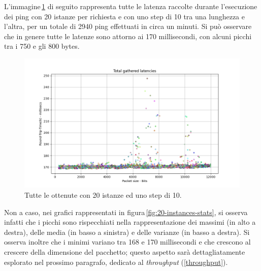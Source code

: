 \noindent L'immagine\,\ref{fig:20-instances-total} di seguito rappresenta tutte le latenza raccolte durante l'esecuzione dei ping con 20 istanze per richiesta e con uno step di 10 tra una lunghezza e l'altra, per un totale di 2940 ping effettuati in circa un minuti. Si può osservare che in genere tutte le latenze sono attorno ai 170 millisecondi, con alcuni picchi tra i 750 e gli 800 bytes.
\begin{figure}[h]
    \centering
    \includegraphics[width = .9\textwidth]{hw-2/report/imgs/20-instances/la-total-latencies.png}
    \caption{Tutte le ottenute con 20 istanze ed uno step di 10.}
    \label{fig:20-instances-total}
\end{figure}
Non a caso, nei grafici rappresentati in figura\,\ref{fig:20-instances-stats}, si osserva infatti che i picchi sono rispecchiati nella rappresentazione dei massimi (in alto a destra), delle media (in basso a sinistra) e delle varianze (in basso a destra). Si osserva inoltre che i minimi variano tra 168 e 170 millisecondi e che crescono al crescere della dimensione del pacchetto; questo aspetto sarà dettagliatamente esplorato nel prossimo paragrafo, dedicato al \textsl{throughput} (\ref{throughput}).
